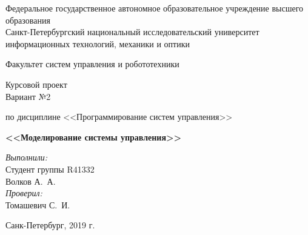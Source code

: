 \begin{titlepage}
\begin{center}


{\normalsize 
Федеральное государственное автономное образовательное учреждение высшего образования 
\\Санкт-Петербургский национальный исследовательский университет 
\\информационных технологий, механики и оптики}

\vspace{1.5cm}

\vspace{0.5cm}
\large Факультет систем управления и робототехники
\vspace{2cm}

\large Курсовой проект
\\ Вариант №2

по дисциплине <<Программирование систем управления>>

{ \large \bfseries <<Моделирование системы управления>>\\[0.4cm] }

\noindent

\begin{flushright} \normalsize
\emph{Выполнили:}\\
Студент группы R41332\\
Волков \textsc{А.~А.}\\

\emph{Проверил:} \\
Томашевич \textsc{С.~И.}
\end{flushright}

\vfill

{\normalsize Санк-Петербург, 2019 г.}

\end{center}
\end{titlepage}
